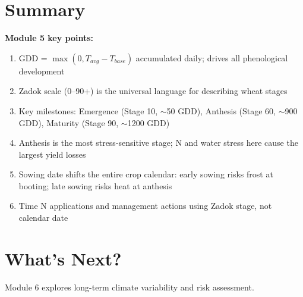 \section{Summary}

\begin{keyconceptbox}
\textbf{Module 5 key points:}
\begin{enumerate}
  \item GDD = $\max(0, T_{avg} - T_{base})$ accumulated daily; drives all phenological development
  \item Zadok scale (0--90+) is the universal language for describing wheat stages
  \item Key milestones: Emergence (Stage 10, $\sim$50 GDD), Anthesis (Stage 60, $\sim$900 GDD), Maturity (Stage 90, $\sim$1200 GDD)
  \item Anthesis is the most stress-sensitive stage; N and water stress here cause the largest yield losses
  \item Sowing date shifts the entire crop calendar: early sowing risks frost at booting; late sowing risks heat at anthesis
  \item Time N applications and management actions using Zadok stage, not calendar date
\end{enumerate}
\end{keyconceptbox}

\section{What's Next?}

Module 6 explores long-term climate variability and risk assessment.

